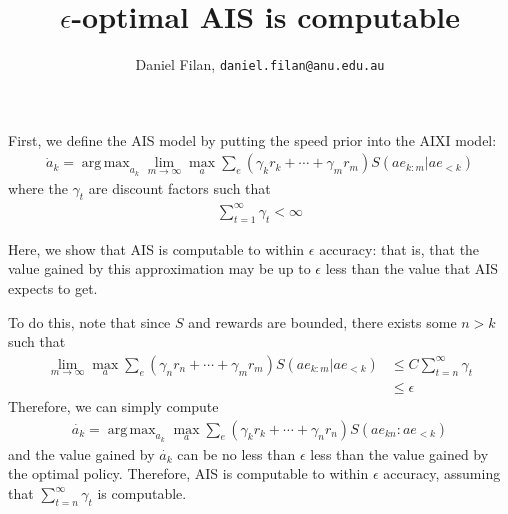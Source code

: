 \documentclass[12pt]{article}
\title{$\epsilon$-optimal AIS is computable}
\author{Daniel Filan, \texttt{daniel.filan@anu.edu.au}}
\date{}
\DeclareMathOperator*{\argmax}{arg\,max}
\begin{document}
 
\maketitle

First, we define the AIS model by putting the speed prior into the AIXI model:
\begin{align*}
  \dot{a}_k = \argmax_{a_k} \lim_{m \rightarrow \infty} \max_a \sum_e (\gamma_k r_k + \dotsb + \gamma_m r_m) S(ae_{k:m} | ae_{<k})
\end{align*}
where the $\gamma_t$ are discount factors such that
\begin{align*}
  \sum_{t=1}^\infty \gamma_t < \infty
\end{align*}

Here, we show that AIS is computable to within $\epsilon$ accuracy: that is, that the value gained by this approximation may be up to $\epsilon$ less than the value that AIS expects to get.

To do this, note that since $S$ and rewards are bounded, there exists some $n > k$ such that
\begin{align*}
  \lim_{m \rightarrow \infty} \max_a \sum_e (\gamma_n r_n + \dotsb + \gamma_m r_m) S(ae_{k:m} | ae_{<k}) &\leq C \sum_{t = n}^\infty \gamma_t \\
  &\leq \epsilon
\end{align*}
Therefore, we can simply compute
\begin{align*}
  \dot{a_k}= \argmax_{a_k} \max_a \sum_e (\gamma_k r_k + \dotsb + \gamma_n r_n) S(ae_{kn}:ae_{<k})
\end{align*}
and the value gained by $\dot{a_k}$ can be no less than $\epsilon$ less than the value gained by the optimal policy. Therefore, AIS is computable to within $\epsilon$ accuracy, assuming that $\sum_{t = n}^\infty \gamma_t$ is computable.
\end{document}
